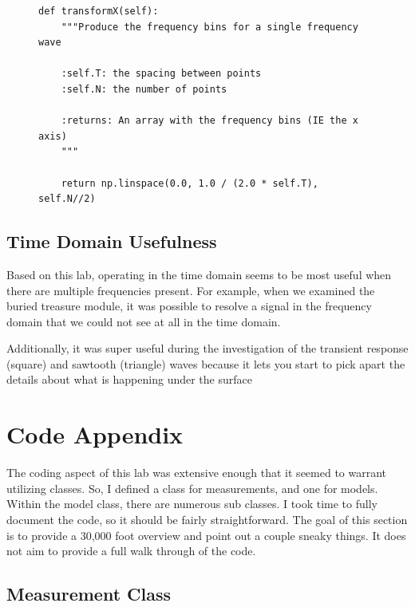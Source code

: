 \documentclass{article}
\begin{document}
\begin{figure}[H]
\centering
\begin{minipage}{1\textwidth}
\begin{tcolorbox}
\begin{verbatim}
def transformX(self):
    """Produce the frequency bins for a single frequency wave

    :self.T: the spacing between points
    :self.N: the number of points

    :returns: An array with the frequency bins (IE the x axis)
    """

    return np.linspace(0.0, 1.0 / (2.0 * self.T), self.N//2)
\end{verbatim}
\end{tcolorbox}
\end{minipage}
\end{figure}


\subsection{Time Domain Usefulness}%
\label{sub:time_domain_usefulness}

Based on this lab, operating in the time domain seems to be most useful when
there are multiple frequencies present. For example, when we examined the
buried treasure module, it was possible to resolve a signal in the frequency
domain that we could not see at all in the time domain.

Additionally, it was super useful during the investigation of the transient
response (square) and sawtooth (triangle) waves because it lets you start to
pick apart the details about what is happening under the surface

\section{Code Appendix}%
\label{sec:code_appendix}

The coding aspect of this lab was extensive enough that it seemed
to warrant utilizing classes. So, I defined a class for measurements, and one
for models. Within the model class, there are numerous sub classes. I took time
to fully document the code, so it should be fairly straightforward. The goal of
this section is to provide a 30,000 foot overview and point out a couple sneaky
things. It does not aim to provide a full walk through of the code.


\subsection{Measurement Class}%
\label{sub:measurement_class}
\end{document}
